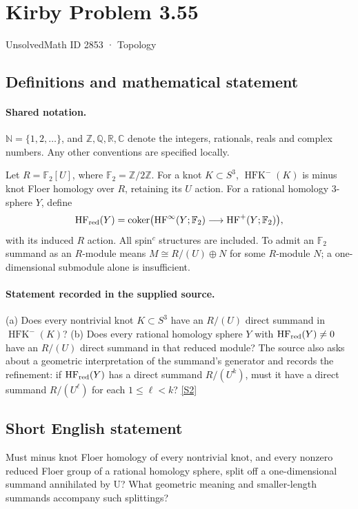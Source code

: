 \documentclass[11pt]{article}
\newcommand{\sref}[2]{\hyperlink{source:#1:#2}{[S#2]}}
\begin{document}
\setcounter{section}{2852}
\section{Kirby Problem 3.55}\label{2853}
{\small\sffamily UnsolvedMath ID 2853 · Topology}
\subsection{Definitions and mathematical statement}

\paragraph{Shared notation.}$\mathbb N=\{1,2,\ldots\}$, and $\mathbb Z,\mathbb Q,\mathbb R,\mathbb C$ denote the integers, rationals, reals and complex numbers. Any other conventions are specified locally.


Let $R=\mathbb F_2[U]$, where $\mathbb F_2=\mathbb Z/2\mathbb Z$. For a knot $K\subset S^3$, $\operatorname{HFK}^-(K)$ is minus knot Floer homology over $R$, retaining its $U$ action. For a rational homology $3$-sphere $Y$, define
\[
\operatorname{HF}_{\rm red}(Y)=\operatorname{coker}\bigl(\operatorname{HF}^{\infty}(Y;\mathbb F_2)\longrightarrow\operatorname{HF}^{+}(Y;\mathbb F_2)\bigr),
\]
with its induced $R$ action. All spin$^c$ structures are included. To admit an $\mathbb F_2$ summand as an $R$-module means $M\cong R/(U)\oplus N$ for some $R$-module $N$; a one-dimensional submodule alone is insufficient.
\paragraph{Statement recorded in the supplied source.}
(a) Does every nontrivial knot $K\subset S^3$ have an $R/(U)$ direct summand in $\operatorname{HFK}^-(K)$? (b) Does every rational homology sphere $Y$ with $\operatorname{HF}_{\rm red}(Y)\ne0$ have an $R/(U)$ direct summand in that reduced module?
The source also asks about a geometric interpretation of the summand's generator and records the refinement: if $\operatorname{HF}_{\rm red}(Y)$ has a direct summand $R/(U^k)$, must it have a direct summand $R/(U^\ell)$ for each $1\le\ell<k$? \sref{2853}{2}
\subsection{Short English statement}
Must minus knot Floer homology of every nontrivial knot, and every nonzero reduced Floer group of a rational homology sphere, split off a one-dimensional summand annihilated by U? What geometric meaning and smaller-length summands accompany such splittings?
\end{document}
